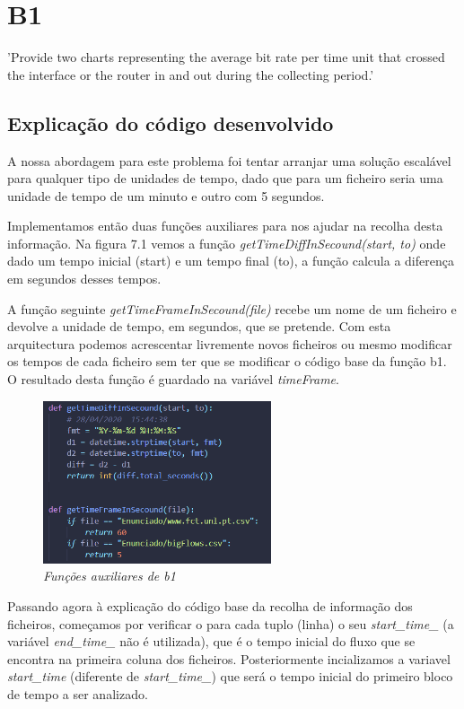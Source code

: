 \chapter{B1}

{\LARGE 'Provide two charts representing the average bit rate per time unit that crossed the interface or the router in and out during the collecting period.'}

\section{Explicação do código desenvolvido}

A nossa abordagem para este problema foi tentar arranjar uma solução escalável para qualquer tipo de unidades de tempo, dado que para um ficheiro seria uma unidade de tempo de um minuto e outro com 5 segundos. 

Implementamos então duas funções auxiliares para nos ajudar na recolha desta informação. Na figura 7.1 vemos a função \textit{getTimeDiffInSecound(start, to)} onde dado um tempo inicial (start) e um tempo final (to), a função calcula a diferença em segundos desses tempos. 

A função seguinte \textit{getTimeFrameInSecound(file)} recebe um nome de um ficheiro e devolve a unidade de tempo, em segundos, que se pretende. Com esta arquitectura podemos acrescentar livremente novos ficheiros ou mesmo modificar os tempos de cada ficheiro sem ter que se modificar o código base da função b1. O resultado desta função é guardado na variável \textit{timeFrame}.

\begin{figure}[h!]
    \label{high}
    \centering
    \includegraphics[width=0.6\textwidth]{Images/b1/auxFunctions.png}
    \caption{\textit{Funções auxiliares de b1}}
\end{figure}

Passando agora à explicação do código base da recolha de informação dos ficheiros, começamos por verificar o para cada tuplo (linha) o seu \textit{start\_time\_} (a variável \textit{end\_time\_} não é utilizada), que é o tempo inicial do fluxo que se encontra na primeira coluna dos ficheiros. Posteriormente incializamos a variavel \textit{start\_time} (diferente de \textit{start\_time\_}) que será o tempo inicial do primeiro bloco de tempo a ser analizado. 

